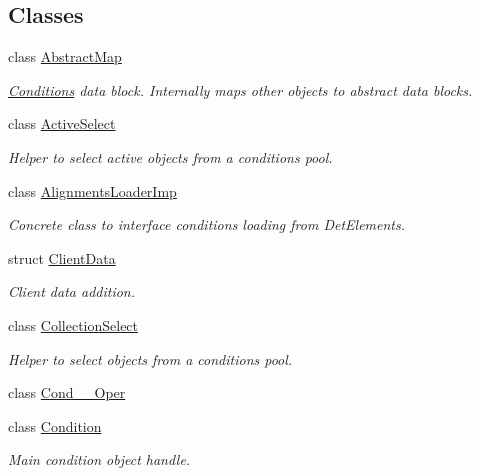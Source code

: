 \subsection*{Classes}
\begin{DoxyCompactItemize}
\item 
class \hyperlink{class_d_d4hep_1_1_conditions_1_1_abstract_map}{Abstract\+Map}
\begin{DoxyCompactList}\small\item\em \hyperlink{namespace_d_d4hep_1_1_conditions}{Conditions} data block. Internally maps other objects to abstract data blocks. \end{DoxyCompactList}\item 
class \hyperlink{class_d_d4hep_1_1_conditions_1_1_active_select}{Active\+Select}
\begin{DoxyCompactList}\small\item\em Helper to select active objects from a conditions pool. \end{DoxyCompactList}\item 
class \hyperlink{class_d_d4hep_1_1_conditions_1_1_alignments_loader_imp}{Alignments\+Loader\+Imp}
\begin{DoxyCompactList}\small\item\em Concrete class to interface conditions loading from Det\+Elements. \end{DoxyCompactList}\item 
struct \hyperlink{struct_d_d4hep_1_1_conditions_1_1_client_data}{Client\+Data}
\begin{DoxyCompactList}\small\item\em Client data addition. \end{DoxyCompactList}\item 
class \hyperlink{class_d_d4hep_1_1_conditions_1_1_collection_select}{Collection\+Select}
\begin{DoxyCompactList}\small\item\em Helper to select objects from a conditions pool. \end{DoxyCompactList}\item 
class \hyperlink{class_d_d4hep_1_1_conditions_1_1_cond_____oper}{Cond\+\_\+\+\_\+\+Oper}
\item 
class \hyperlink{class_d_d4hep_1_1_conditions_1_1_condition}{Condition}
\begin{DoxyCompactList}\small\item\em Main condition object handle. \end{DoxyCompactList}\item 

\end{DoxyCompactItemize}
